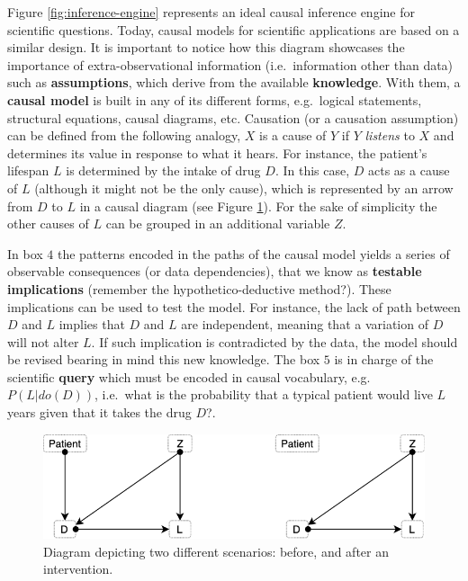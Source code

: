 \documentclass[
]{book}
\begin{document}
Figure \ref{fig:inference-engine} represents an ideal causal inference engine for scientific questions. Today, causal models for scientific applications are based on a similar design. It is important to notice how this diagram showcases the importance of extra-observational information (i.e.~information other than data) such as \textbf{assumptions}, which derive from the available \textbf{knowledge}. With them, a \textbf{causal model} is built in any of its different forms, e.g.~logical statements, structural equations, causal diagrams, etc. Causation (or a causation assumption) can be defined from the following analogy, \(X\) is a cause of \(Y\) if \(Y\) \emph{listens} to \(X\) and determines its value in response to what it hears. For instance, the patient's lifespan \(L\) is determined by the intake of drug \(D\). In this case, \(D\) acts as a cause of \(L\) (although it might not be the only cause), which is represented by an arrow from \(D\) to \(L\) in a causal diagram (see Figure \ref{fig:blueprint}). For the sake of simplicity the other causes of \(L\) can be grouped in an additional variable \(Z\).

In box \(4\) the patterns encoded in the paths of the causal model yields a series of observable consequences (or data dependencies), that we know as \textbf{testable implications} (remember the hypothetico-deductive method?). These implications can be used to test the model. For instance, the lack of path between \(D\) and \(L\) implies that \(D\) and \(L\) are independent, meaning that a variation of \(D\) will not alter \(L\). If such implication is contradicted by the data, the model should be revised bearing in mind this new knowledge. The box \(5\) is in charge of the scientific \textbf{query} which must be encoded in causal vocabulary, e.g.~\(P(L | do(D))\), i.e.~what is the probability that a typical patient would live \(L\) years given that it takes the drug \(D\)?.

\begin{figure}

{\centering \includegraphics[width=0.7\linewidth]{Figures/blueprint} 

}

\caption{Diagram depicting two different scenarios: before, and after an intervention.}\label{fig:blueprint}
\end{figure}
\end{document}
